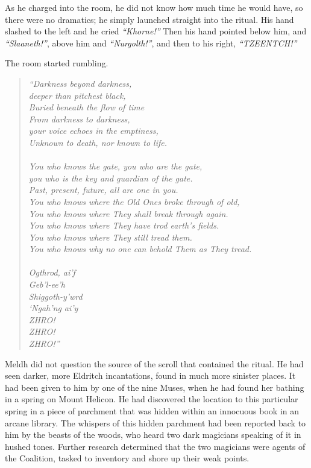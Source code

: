As he charged into the room, he did not know how much time he would have, so there were no dramatics; he simply launched straight into the ritual. His hand slashed to the left and he cried \emph{“Khorne!”} Then his hand pointed below him, and \emph{“Slaaneth!”}, above him and \emph{“Nurgolth!”}, and then to his right, \emph{“TZEENTCH!”}

The room started rumbling.
\SmallVSpace
\small{\begin{quote}\textit{
“Darkness beyond darkness,\\
deeper than pitchest black,\\
Buried beneath the flow of time{\el}\\
From darkness to darkness,\\
your voice echoes in the emptiness,\\
Unknown to death, nor known to life.\\\\
}
\textit{
You who knows the gate, you who are the gate,\\
you who is the key and guardian of the gate.\\
Past, present, future, all are one in you.\\
You who knows where the Old Ones broke through of old,\\
You who knows where They shall break through again.\\
You who knows where They have trod earth’s fields.\\
You who knows where They still tread them.\\
You who knows why no one can behold Them as They tread.\\\\
}
\textit{
Ogthrod, ai’f\\
Geb’l-ee’h\\
Shiggoth-y’wrd\\
‘Ngah’ng ai’y\\
ZHRO!\\
ZHRO!\\
ZHRO!”
}\end{quote}}\normalsize
Meldh did not question the source of the scroll that contained the ritual. He had seen darker, more Eldritch incantations, found in much more sinister places. It had been given to him by one of the nine Muses, when he had found her bathing in a spring on Mount Helicon. He had discovered the location to this particular spring in a piece of parchment that was hidden within an innocuous book in an arcane library. The whispers of this hidden parchment had been reported back to him by the beasts of the woods, who heard two dark magicians speaking of it in hushed tones. Further research determined that the two magicians were agents of the Coalition, tasked to inventory and shore up their weak points.

